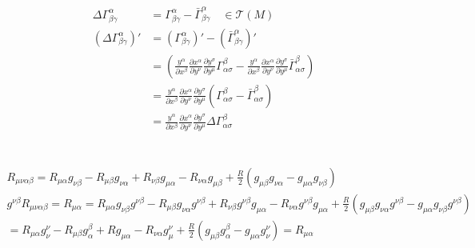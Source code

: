 \documentclass{article}
\begin{document}
\section{}
\begin{align*}
  \Delta \Gamma _{\beta\gamma} ^ {\alpha} &= \Gamma _{\beta\gamma} ^ {\alpha} - \bar \Gamma _{\beta\gamma} ^ {\alpha} \quad \in \mathcal{T}(M) \\
  (\Delta \Gamma _{\beta\gamma}  ^ {\alpha} )' &= (\Gamma _{\beta\gamma}  ^ {\alpha})' - (\bar \Gamma _{\beta\gamma} ^ {\alpha})'\\
  &= \left(\frac{ y ^ {\alpha} }{\partial x ^ {\beta}} \frac{\partial x ^ {\alpha} }{\partial y ^ {\nu}} \frac{\partial y ^ {\sigma} }{\partial y ^ {\mu}} \Gamma _{\alpha\sigma} ^ {\beta} - \frac{ y ^ {\alpha} }{\partial x ^ {\beta}} \frac{\partial x ^ {\alpha} }{\partial y ^ {\nu}} \frac{\partial y ^ {\sigma} }{\partial y ^ {\mu}} \bar\Gamma _{\alpha\sigma} ^ {\beta}\right) \\
  &=\frac{ y ^ {\alpha} }{\partial x ^ {\beta}} \frac{\partial x ^ {\alpha} }{\partial y ^ {\nu}} \frac{\partial y ^ {\sigma} }{\partial y ^ {\mu}} (\Gamma _{\alpha\sigma}  ^ {\beta} - \bar \Gamma _{\alpha\sigma}  ^ {\beta})\\
  &= \frac{ y ^ {\alpha} }{\partial x ^ {\beta}} \frac{\partial x ^ {\alpha} }{\partial y ^ {\nu}} \frac{\partial y ^ {\sigma} }{\partial y ^ {\mu}}\Delta \Gamma _{\alpha\sigma}  ^ {\beta}
\end{align*}


\section{}



\section{}
\begin{gather*}
  R _{\mu\nu\alpha\beta}  = R _{\mu\alpha} g _{\nu\beta} - R _{\mu\beta} g _{\nu\alpha} + R _{\nu\beta} g _{\mu\alpha} - R _{\nu\alpha} g _{\mu\beta} + \frac{R }{2 } (g _{\mu\beta} g _{\nu\alpha } - g _{\mu\alpha} g _{\nu\beta} ) \\
  g ^ {\nu\beta} R _{\mu\nu\alpha\beta}  = R _{\mu\alpha}  = R _{\mu\alpha} g _{\nu\beta} g ^ {\nu\beta} - R _{\mu\beta} g _{\nu\alpha} g ^ {\nu\beta} + R _{\nu\beta} g ^ {\nu\beta} g _{\mu\alpha} - R _{\nu\alpha} g ^ {\nu\beta} g _{\mu\alpha} + \frac{R }{2} ( g _{\mu\beta} g _{\nu\alpha} g ^ {\nu\beta}- g _{\mu\alpha}  g _{\nu\beta} g ^ {\nu\beta})\\
  = R _{\mu\alpha}  g _\nu^\nu - R _{\mu\beta} g _\alpha^\beta + R g _{\mu\alpha} - R _{\nu\alpha}  g _\mu^\nu + \frac{R }{2} (g _{\mu\beta} g_\alpha^\beta - g _{\mu\alpha} g_\nu^\nu) = R _{\mu\alpha} 
\end{gather*}
\end{document}
